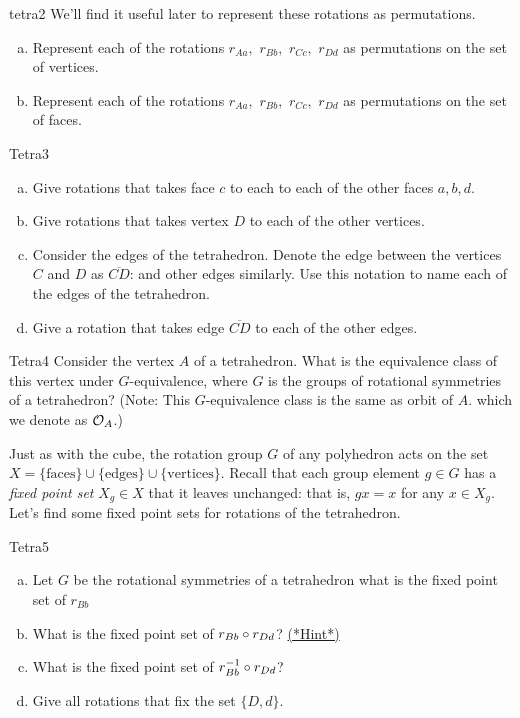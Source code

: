 \begin {exercise}{tetra2}
We'll find it useful later to represent these rotations as permutations.
\begin {enumerate}[(a)] 
\item Represent each of the rotations $r_{Aa},$ $r_{Bb},$ $r_{Cc},$ $r_{Dd}$ as permutations on the set of vertices.
\item Represent each of the rotations $r_{Aa},$ $r_{Bb},$ $r_{Cc},$ $r_{Dd}$ as permutations on the set of faces.
\end{enumerate}
\end {exercise}
\begin {exercise}{Tetra3}
\begin {enumerate}[(a)]
\item Give rotations that takes face $c$ to each to each of the other faces $a, b, d$.
\item Give rotations that takes vertex $D$ to each of the other vertices.
\item Consider the edges of the tetrahedron.  Denote the edge between the vertices $C$ and $D$ as $\overline{CD}$: and other edges similarly.  Use this notation to name each of the edges of the tetrahedron.
 \item Give a rotation that takes edge $\overline{CD}$ to each of the other edges.
\end{enumerate}
\end{exercise} 
\begin {exercise}{Tetra4}
Consider the vertex $A$ of a tetrahedron.  What is the equivalence class of this vertex under $G$-equivalence, where $G$ is the groups of rotational symmetries of a tetrahedron?   (Note:  This $G$-equivalence class is the same as orbit of $A$. which we denote as ${\cal O}_A$.)
\end {exercise}


Just as with the cube, the rotation group $G$ of any polyhedron acts on the set $X=\{\text{faces}\}\cup\{\text{edges}\}\cup\{\text{vertices}\}$. Recall that each group element $g\in G$ has a \emph{fixed point set} $X_g\in X$ that it leaves unchanged: that is, $gx=x$ for any $x\in X_g$. Let's find some fixed point sets for rotations of the tetrahedron.

\begin {exercise}{Tetra5}
\begin {enumerate}[(a)]
\item Let $G$ be the rotational symmetries of a tetrahedron what is the fixed point set of $r_{Bb}$
\item What is the fixed point set of $r_{Bb}\circ r_{Dd}$? 
\hyperref[sec:actions:hints]{(*Hint*)}
\item What is the fixed point set of $r_{Bb}^{-1}\circ r_{Dd}$?
\item Give all rotations that fix the set $\{D,d\}$. 
\end{enumerate}
\end {exercise}

